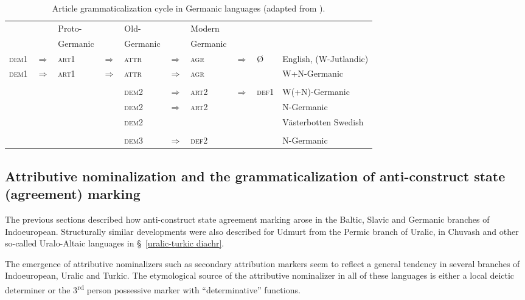 {\begin{landscape}%
\begin{table}
\begin{center}
\begin{footnotesize}
\begin{tabular}[t]{l l l l l l l l l l}
\hline
\hline
&	&Proto-& &Old-&	&Modern&&\\
&	&Germanic&	&Germanic&	&Germanic&&\\
\hline							
\textsc{dem1}&$\Rightarrow$&\textsc{art1}&$\Rightarrow$&\textsc{attr}&$\Rightarrow$&\textsc{agr}&$\Rightarrow$&Ø&English, (W-Jutlandic)\\
\textsc{dem1}&$\Rightarrow$&\textsc{art1}&$\Rightarrow$&\textsc{attr}&$\Rightarrow$&\textsc{agr}&&&W+N-Germanic\\
\\
&&&		&\textsc{dem2}&$\Rightarrow$&\textsc{art2}&$\Rightarrow$&\textsc{def1}&W(+N)-Germanic\\
&&&		&\textsc{dem2}&$\Rightarrow$&\textsc{art2}&&&N-Germanic\\
&&&		&\textsc{dem2}&&&&&Västerbotten Swedish\\
\\
&&&		&\textsc{dem3}&$\Rightarrow$&\textsc{def2}&&&N-Germanic\\
\hline
\hline
\end{tabular}
\end{footnotesize}
\end{center}
\caption[Article grammaticalization cycle in Germanic]{Article grammaticalization cycle in Germanic languages (adapted from \citealt[272]{riesler2006a}).}
\end{table}
\end{landscape}

\subsection[Attributive nominalization and anti-construct state]{Attributive nominalization and the grammaticalization of anti-construct state (agreement) marking}
The previous sections described how anti-construct state agreement marking arose in the Baltic, Slavic and Germanic branches of Indoeuropean. Structurally similar developments were also described for Udmurt from the Permic branch of Uralic, in Chuvash and other so-called Uralo-Altaic languages in \S~\ref{uralic-turkic diachr}. 

The emergence of attributive nominalizers such as secondary attribution markers seem to reflect a general tendency in several branches of Indoeuropean, Uralic and Turkic. The etymological source of the attributive nominalizer in all of these languages is either a local deictic determiner or the 3\textsuperscript{rd} person possessive marker with “determinative” functions.

}
